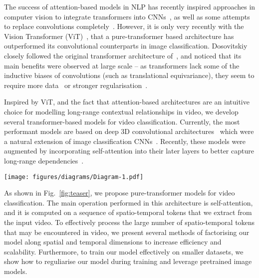 \documentclass[10pt,twocolumn,letterpaper]{article}
\begin{document}
The success of attention-based models in NLP has recently inspired approaches in computer vision to integrate transformers into CNNs~\cite{wang_cvpr_2018, carion_eccv_2020}, as well as some attempts to replace convolutions completely~\cite{parmar_icml_2018, bello_iccv_2019, ramachandran_neurips_2019}. 
However, it is only very recently with the Vision Transformer (ViT)~\cite{dosovitskiy_iclr_2021}, that a pure-transformer based architecture has outperformed its convolutional counterparts in image classification.
Dosovitskiy~\etal~\cite{dosovitskiy_iclr_2021} closely followed the original transformer architecture of~\cite{vaswani_neurips_2017}, and noticed that its main benefits were observed at large scale -- as transformers lack some of the inductive biases of convolutions (such as translational equivariance), they seem to require more data~\cite{dosovitskiy_iclr_2021} or stronger regularisation~\cite{touvron_arxiv_2020}.


Inspired by ViT, and the fact that attention-based architectures are an intuitive choice for modelling long-range contextual relationships in video, we develop several transformer-based models for video classification.
Currently, the most performant models are based on deep 3D convolutional architectures~\cite{carreira_cvpr_2017, feichtenhofer_cvpr_2020, feichtenhofer_iccv_2019} which were a natural extension of image classification CNNs~\cite{he_cvpr_2016, szegedy_cvpr_2015}.
Recently, these models were augmented by incorporating self-attention into their later layers to better capture long-range dependencies~\cite{wang_cvpr_2018, girdhar_cvpr_2019, wu_cvpr_2019, arnab_graph_structured_iccv_2021}.

\begin{figure*}
    \centering
    \texttt{[image: figures/diagrams/Diagram-1.pdf]}
	\caption{
		We propose a pure-transformer architecture for video classification, inspired by the recent success of such models for images~\cite{dosovitskiy_iclr_2021}.
		To effectively process a large number of spatio-temporal tokens, we develop several model variants which factorise different components of the transformer encoder over the spatial- and temporal-dimensions.
		As shown on the right, these factorisations correspond to different attention patterns over space and time.
	}
	\vspace{-3mm}
    \label{fig:teaser}
\end{figure*} 


As shown in Fig.~\ref{fig:teaser}, we propose pure-transformer models for video classification.
The main operation performed in this architecture is self-attention, and it is computed on a sequence of spatio-temporal tokens that we extract from the input video.
To effectively process the large number of spatio-temporal tokens that may be encountered in video, we present several methods of factorising our model along spatial and temporal dimensions to increase efficiency and scalability.
Furthermore, to train our model effectively on smaller datasets, we show how to reguliarise our model during training and leverage pretrained image models.
\end{document}
